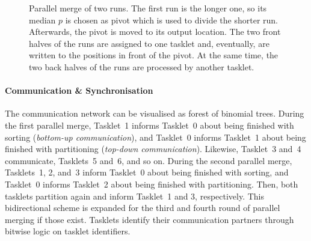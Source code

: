 \begin{figure}
	\caption{
		Parallel merge of two runs.
		The first run is the longer one, so its median \(p\) is chosen as pivot which is used to divide the shorter run.
		Afterwards, the pivot is moved to its output location.
		The two front halves of the runs are assigned to one tasklet and, eventually, are written to the positions in front of the pivot.
		At the same time, the two back halves of the runs are processed by another tasklet.
		\cite[Figure~27.6]{cormen2013algorithmen}
	}
	\label{fig:par:merge}
\end{figure}


\paragraph{Communication \& Synchronisation}
The communication network can be visualised as forest of binomial trees.
During the first parallel merge, Tasklet~1 informs Tasklet~0 about being finished with sorting (\emph{bottom-up communication}), and Tasklet~0 informs Tasklet~1 about being finished with partitioning (\emph{top-down communication}).
Likewise, Tasklet~3 and~4 communicate, Tasklets~5 and~6, and so on.
During the second parallel merge, Tasklets~1, 2, and~3 inform Tasklet~0 about being finished with sorting, and Tasklet~0 informs Tasklet~2 about being finished with partitioning.
Then, both tasklets partition again and inform Tasklet~1 and 3, respectively.
This bidirectional scheme is expanded for the third and fourth round of parallel merging if those exist.
Tasklets identify their communication partners through bitwise logic on tasklet identifiers.

